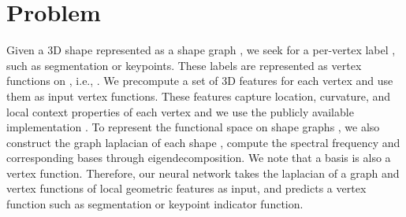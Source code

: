 \documentclass[10pt,twocolumn,letterpaper]{article}
\newcommand{\cmt}[2]{[#1: #2]}
\newcommand{\todo}[1]{\cmt{{\bf TODO}}{{\bf \color{blue} #1}}}
\begin{document}
\iffalse
\todo{ 
\begin{itemize}
\item{Spatial Construction: \\GCNN: requires a triangular mesh, could only use small kernels for convolution, sensitive to incomplete input data; \\Deep Locally Connected Networks: no parameter sharing among convolution kernels, needs sophisticated hierarchical graph clustering for multi-resolution processing;}
\item{Spectral Construction: \\SCNN: lack of generalizability, cannot be used across different graph domains; \\LSCNN: uses localized kernel function for convolution, has better generalizability but not good at capturing global context efficiently; \\ACNN: considers oriented pattern while constructing the convolution kernels but still not tackles the generalizability problem.}
\end{itemize}
}
\fi

 
\section{Problem}
\label{sec:problem}
Given a 3D shape  represented as a shape graph , we seek for a per-vertex label , such as segmentation or keypoints. These labels are represented as vertex functions  on , i.e., . We precompute a set of 3D features for each vertex  and use them as input vertex functions. These features capture location, curvature, and local context properties of each vertex  and we use the publicly available implementation \cite{kim2014shape2pose}. To represent the functional space on shape graphs , we also construct the graph laplacian  of each shape , compute the spectral frequency  and corresponding bases  through eigendecomposition. We note that a basis  is also a vertex function. Therefore, our neural network takes the laplacian  of a graph  and vertex functions of local geometric features as input, and predicts a vertex function  such as segmentation or keypoint indicator function.
\end{document}
